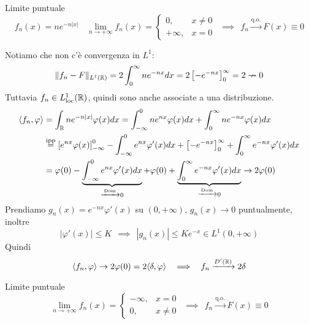 \Soluzione

Limite puntuale
\begin{equation*}
f_{n} (x) = ne^{- n|x|} \ \ \ \ \lim\limits_{n\rightarrow + \infty} f_{n}(x) =
\begin{cases}
0, & x\neq 0\\
+ \infty, & x = 0
\end{cases} \ \ \implies \ \ f_{n}\xrightarrow{\text{q.o.}} F(x) \equiv 0
\end{equation*}

Notiamo che non c'è convergenza in $L^{1}$:
\begin{equation*}
\Vert f_{n} - F\Vert_{L^{1}(\mathbb{R})} = 2\int^{\infty}_{0} ne^{- nx} dx = 2\left[ - e^{- nx}\right]^{\infty}_{0} = 2\nrightarrow 0
\end{equation*}
Tuttavia $f_{n} \in L^{1}_{\operatorname{loc}}(\mathbb{R})$, quindi sono anche associate a una distribuzione.
\begin{equation*}
\begin{aligned}
\langle f_{n}, \varphi \rangle & = \int_{\mathbb{R}} ne^{- n| x|} \varphi (x) dx = \int^{0}_{- \infty} ne^{nx} \varphi (x) dx + \int^{\infty}_{0} ne^{- nx} \varphi (x) dx\\
 & \overset{\text{ipp}}{=}\left[ e^{nx} \varphi (x)\right]^{0}_{- \infty} - \int^{0}_{- \infty} e^{nx} \varphi'(x) dx + \left[ - e^{- nx}\right]^{\infty}_{0} + \int^{\infty}_{0} e^{- nx} \varphi'(x) dx\\
 & = \varphi (0) - \underbrace{\int^{0}_{- \infty} e^{nx} \varphi'(x) dx}_{\xrightarrow{\text{Dom}} 0} + \varphi (0) + \underbrace{\int^{\infty}_{0} e^{- nx} \varphi'(x) dx}_{\xrightarrow{\text{Dom}} 0}\rightarrow 2\varphi (0)
\end{aligned}
\end{equation*}
Prendiamo $g_{n}(x) = e^{- nx} \varphi'(x)$ su $(0, + \infty)$, $g_{n}(x)\rightarrow 0$ puntualmente, inoltre
\begin{equation*}
| \varphi'(x)| \leq K\ \ \implies \ \ | g_{n}(x)| \leq Ke^{- x} \in L^{1}(0, + \infty)
\end{equation*}
Quindi
\begin{equation*}
\langle f_{n}, \varphi \rangle \rightarrow 2\varphi (0) = 2\langle \delta, \varphi \rangle \ \ \implies \ \ f_{n}\xrightarrow{D'(\mathbb{R})} 2\delta
\end{equation*}

\Soluzione

Limite puntuale
\begin{equation*}
\lim\limits_{n\rightarrow + \infty} f_{n}(x) =
\begin{cases}
- \infty, & x = 0\\
0, & x\neq 0
\end{cases} \ \ \implies \ \ f_{n}\xrightarrow{\text{q.o.}} F(x) \equiv 0
\end{equation*}


